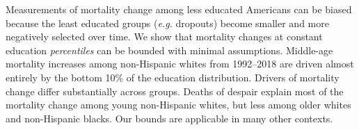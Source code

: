 Measurements of mortality change among less educated Americans can be biased because the least educated groups (\textit{e.g.} dropouts) become smaller and more negatively selected over time. We show that mortality changes at constant education \textit{percentiles} can be bounded with minimal assumptions. Middle-age mortality increases among non-Hispanic whites from 1992--2018 are driven almost entirely by the bottom 10\% of the education distribution. Drivers of mortality change differ substantially across groups. Deaths of despair explain most of the mortality change among young non-Hispanic whites, but less among older whites and non-Hispanic blacks. Our bounds are applicable in many other contexts.
